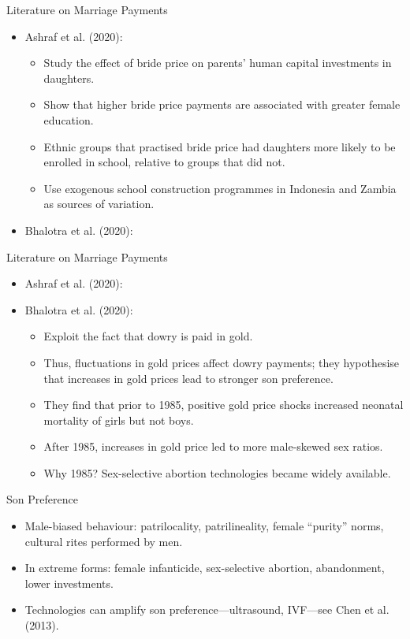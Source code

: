 \documentclass[11pt,notes=hide,aspectratio=169,mathserif]{beamer}
\begin{document}
\begin{frame}{Literature on Marriage Payments}
\begin{itemize}
  \item Ashraf et al. (2020):
  \begin{itemize}
    \item Study the effect of bride price on parents' human capital investments in daughters.
    \item Show that higher bride price payments are associated with greater female education.
    \item Ethnic groups that practised bride price had daughters more likely to be enrolled in school, relative to groups that did not.
    \item Use exogenous school construction programmes in Indonesia and Zambia as sources of variation.
  \end{itemize}
  \item Bhalotra et al. (2020):
\end{itemize}
\end{frame}

\begin{frame}{Literature on Marriage Payments}
\begin{itemize}
  \item Ashraf et al. (2020):
  \item Bhalotra et al. (2020):
  \begin{itemize}
    \item Exploit the fact that dowry is paid in gold.
    \item Thus, fluctuations in gold prices affect dowry payments; they hypothesise that increases in gold prices lead to stronger son preference.
    \item They find that prior to 1985, positive gold price shocks increased neonatal mortality of girls but not boys.
    \pause \item After 1985, increases in gold price led to more male-skewed sex ratios.
    \pause \item Why 1985? Sex-selective abortion technologies became widely available.
  \end{itemize}
\end{itemize}
\end{frame}

\begin{frame}{Son Preference}
\begin{itemize}
  \item Male-biased behaviour: patrilocality, patrilineality, female “purity” norms, cultural rites performed by men.
  \item In extreme forms: female infanticide, sex-selective abortion, abandonment, lower investments.
  \item Technologies can amplify son preference—ultrasound, IVF—see Chen et al. (2013).
\end{itemize}
\end{frame}
\end{document}
